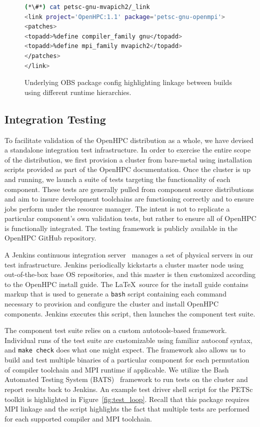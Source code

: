 \documentclass{sig-alternate-05-2015}
\begin{document}
\begin{figure}[h]
\begin{lstlisting}[language=bash,keywords={},basicstyle=\fontsize{7.8}{10}\ttfamily,keepspaces]
(*\#*) cat petsc-gnu-mvapich2/_link
<link project='OpenHPC:1.1' package='petsc-gnu-openmpi'>
<patches>
<topadd>%define compiler_family gnu</topadd>
<topadd>%define mpi_family mvapich2</topadd>
</patches>
</link>
\end{lstlisting}
\vspace*{-0.3cm}
\caption{Underlying OBS package config highlighting linkage between builds
  using different runtime hierarchies.}
\label{fig:obs_link}
\end{figure}

\subsection{Integration Testing} \label{sec:integ_testing}
To facilitate validation of the OpenHPC distribution as a whole, we have
devised a standalone integration test infrastructure. In order to exercise the
entire scope of the distribution, we first provision a cluster from bare-metal
using installation scripts provided as part of the OpenHPC documentation. Once
the cluster is up and running, we launch a suite of tests targeting the
functionality of each component. These tests are generally
pulled from component source distributions and aim to insure development
toolchains are functioning correctly and to ensure jobs perform under the
resource manager. The intent is not to replicate a particular component's own
validation tests, but rather to ensure all of OpenHPC is functionally
integrated. The testing framework is publicly available in the OpenHPC GitHub
repository.

A Jenkins continuous integration server~\cite{jenkins_url} manages a set of
physical servers in our test infrastructure. Jenkins periodically kickstarts a cluster
master node using out-of-the-box base OS repositories, and this master is then
customized according to the OpenHPC install guide. The \LaTeX\ source for the
install guide contains markup that is used to generate a \texttt{{bash}} script
containing each command necessary to provision and configure the cluster and install OpenHPC
components. Jenkins executes this script, then launches the component test suite.

The component test suite relies on a custom autotools-based framework.
Individual runs of the test suite are customizable using familiar autoconf
syntax, and \texttt{{make check}} does what one might expect. The framework
also allows us to build and test multiple binaries of a particular component
for each permutation of compiler toolchain and MPI runtime if applicable.  We
utilize the Bash Automated Testing System (BATS)~\cite{bats_url} framework to
run tests on the cluster and report results back to Jenkins. An example test
driver shell script for the PETSc toolkit is highlighted in Figure~\ref{fig:test_loop}. Recall that this package
requires MPI linkage and the script highlights the fact that multiple tests are
performed for each supported compiler and MPI toolchain.
\end{document}
